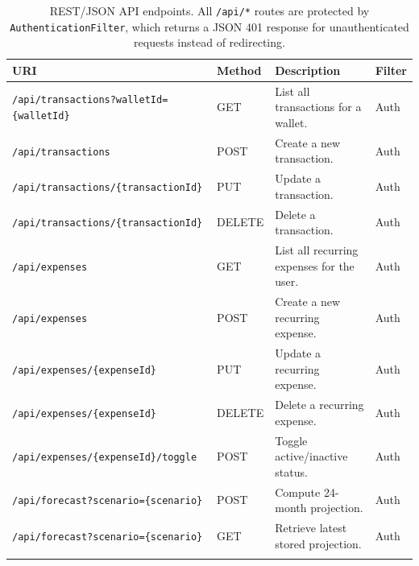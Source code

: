 \begin{longtable}{|p{}|p{} |p{}|p{}|}
\hline
\textbf{URI} & \textbf{Method} & \textbf{Description} & \textbf{Filter} \\\hline

\texttt{/api/transactions?\newline walletId=\{walletId\}} & GET & List all transactions for a wallet. & Auth \\\hline
\texttt{/api/transactions} & POST & Create a new transaction. & Auth \\\hline
\texttt{/api/transactions/\newline\{transactionId\}} & PUT & Update a transaction. & Auth \\\hline
\texttt{/api/transactions/\newline\{transactionId\}} & DELETE & Delete a transaction. & Auth \\\hline

\texttt{/api/expenses} & GET & List all recurring expenses for the user. & Auth \\\hline
\texttt{/api/expenses} & POST & Create a new recurring expense. & Auth \\\hline
\texttt{/api/expenses/\{expenseId\}} & PUT & Update a recurring expense. & Auth \\\hline
\texttt{/api/expenses/\{expenseId\}} & DELETE & Delete a recurring expense. & Auth \\\hline
\texttt{/api/expenses/\newline\{expenseId\}/toggle} & POST & Toggle active/inactive status. & Auth \\\hline

\texttt{/api/forecast?\newline scenario=\{scenario\}} & POST & Compute 24-month projection. & Auth \\\hline
\texttt{/api/forecast?\newline scenario=\{scenario\}} & GET & Retrieve latest stored projection. & Auth \\\hline

\caption{REST/JSON API endpoints. All \texttt{/api/*} routes are protected by \texttt{AuthenticationFilter}, which returns a JSON 401 response for unauthenticated requests instead of redirecting.}
\label{tab:restApiSummary}
\end{longtable}
